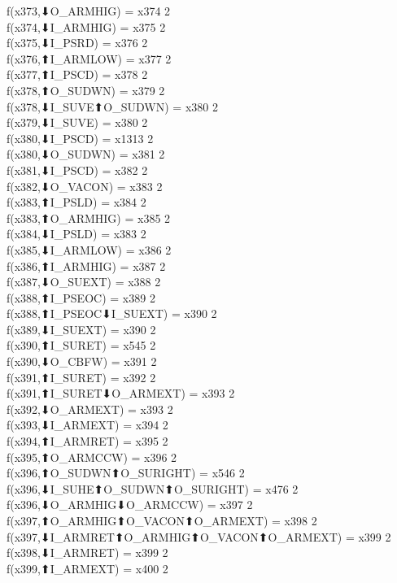 f(x373,⬇O_ARMHIG) = x374 {2} \\
f(x374,⬇I_ARMHIG) = x375 {2} \\
f(x375,⬇I_PSRD) = x376 {2} \\
f(x376,⬆I_ARMLOW) = x377 {2} \\
f(x377,⬆I_PSCD) = x378 {2} \\
f(x378,⬆O_SUDWN) = x379 {2} \\
f(x378,⬇I_SUVE⬆O_SUDWN) = x380 {2} \\
f(x379,⬇I_SUVE) = x380 {2} \\
f(x380,⬇I_PSCD) = x1313 {2} \\
f(x380,⬇O_SUDWN) = x381 {2} \\
f(x381,⬇I_PSCD) = x382 {2} \\
f(x382,⬇O_VACON) = x383 {2} \\
f(x383,⬆I_PSLD) = x384 {2} \\
f(x383,⬆O_ARMHIG) = x385 {2} \\
f(x384,⬇I_PSLD) = x383 {2} \\
f(x385,⬇I_ARMLOW) = x386 {2} \\
f(x386,⬆I_ARMHIG) = x387 {2} \\
f(x387,⬇O_SUEXT) = x388 {2} \\
f(x388,⬆I_PSEOC) = x389 {2} \\
f(x388,⬆I_PSEOC⬇I_SUEXT) = x390 {2} \\
f(x389,⬇I_SUEXT) = x390 {2} \\
f(x390,⬆I_SURET) = x545 {2} \\
f(x390,⬇O_CBFW) = x391 {2} \\
f(x391,⬆I_SURET) = x392 {2} \\
f(x391,⬆I_SURET⬇O_ARMEXT) = x393 {2} \\
f(x392,⬇O_ARMEXT) = x393 {2} \\
f(x393,⬇I_ARMEXT) = x394 {2} \\
f(x394,⬆I_ARMRET) = x395 {2} \\
f(x395,⬆O_ARMCCW) = x396 {2} \\
f(x396,⬆O_SUDWN⬆O_SURIGHT) = x546 {2} \\
f(x396,⬇I_SUHE⬆O_SUDWN⬆O_SURIGHT) = x476 {2} \\
f(x396,⬇O_ARMHIG⬇O_ARMCCW) = x397 {2} \\
f(x397,⬆O_ARMHIG⬆O_VACON⬆O_ARMEXT) = x398 {2} \\
f(x397,⬇I_ARMRET⬆O_ARMHIG⬆O_VACON⬆O_ARMEXT) = x399 {2} \\
f(x398,⬇I_ARMRET) = x399 {2} \\
f(x399,⬆I_ARMEXT) = x400 {2} \\
